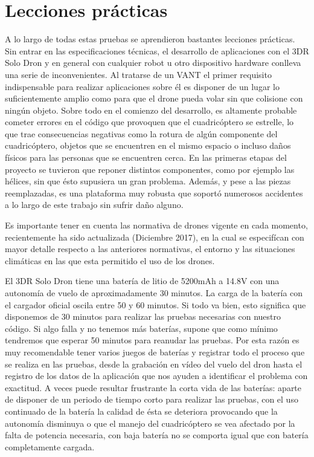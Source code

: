 \section{Lecciones prácticas}
A lo largo de todas estas pruebas se aprendieron bastantes lecciones prácticas. Sin entrar en las especificaciones técnicas, el desarrollo de aplicaciones con el 3DR Solo Dron y en general con cualquier robot u otro dispositivo hardware conlleva una serie de inconvenientes. Al tratarse de un VANT el primer requisito indispensable para realizar aplicaciones sobre él es disponer de un lugar lo suficientemente amplio como para que el drone pueda volar sin que colisione con ningún objeto. Sobre todo en el comienzo del desarrollo, es altamente probable cometer errores en el código que provoquen que el cuadricóptero se estrelle, lo que trae consecuencias negativas como la rotura de algún componente del cuadricóptero, objetos que se encuentren en el mismo espacio o incluso daños físicos para las personas que se encuentren cerca. En las primeras etapas del proyecto se tuvieron que reponer distintos componentes, como por ejemplo las hélices, sin que ésto supusiera un gran problema. Además, y pese a las piezas reemplazadas, es una plataforma muy robusta que soportó numerosos accidentes a lo largo de este trabajo sin sufrir daño alguno.

Es importante tener en cuenta las normativa de drones vigente en cada momento, recientemente ha sido actualizada (Diciembre 2017), en la cual se especifícan con mayor detalle respecto a las anteriores normativas, el entorno y las situaciones climáticas en las que esta permitido el uso de los drones. 

El 3DR Solo Dron tiene una batería de litio de 5200mAh a 14.8V con una autonomía de vuelo de aproximadamente 30 minutos. La carga de la batería con el cargador oficial oscila entre 50 y 60 minutos. Si todo va bien, esto significa que disponemos de 30 minutos para realizar las pruebas necesarias con nuestro código. Si algo falla y no tenemos más baterías, supone que como mínimo tendremos que
esperar 50 minutos para reanudar las pruebas. Por esta razón es muy recomendable tener varios juegos de baterías y registrar todo el proceso que se realiza en las pruebas, desde la grabación en vídeo del vuelo del dron hasta el registro de los datos de la aplicación que nos ayuden a identificar el problema con exactitud. A veces puede resultar frustrante la corta vida de las baterías: aparte de disponer de un periodo de tiempo corto para realizar las pruebas, con el uso continuado de la batería la calidad de ésta se deteriora
provocando que la autonomía disminuya o que el manejo del cuadricóptero se vea afectado por la falta de potencia necesaria, con baja batería no se comporta igual que con batería completamente cargada.

